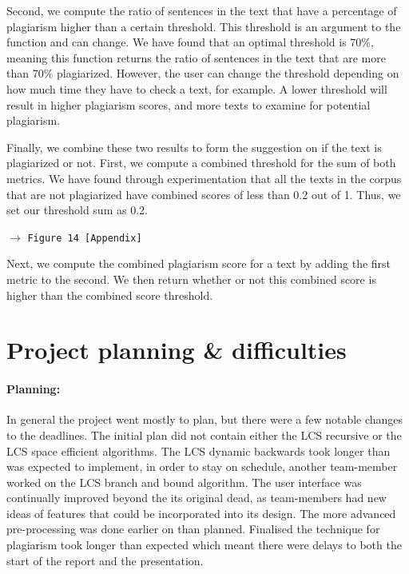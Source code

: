 \documentclass[a4paper,12pt]{article}
\newcommand{\see}[1]{\begin{flushright}$\rightarrow$ \texttt{#1 [Appendix]}\end{flushright}}
\newcommand{\seeFigure}[1]{\see{Figure #1}}
\begin{document}
Second, we compute the ratio of sentences in the text that have a percentage of plagiarism higher than a 
certain threshold. This threshold is an argument to the function and can change. We have found that an optimal 
threshold is 70\%, meaning this function returns the ratio of sentences in the text that are more than 70\% 
plagiarized. However, the user can change the threshold depending on how much time they have to check a text,
for example. A lower threshold will result in higher plagiarism scores, and more texts to examine for potential 
plagiarism. 

Finally, we combine these two results to form the suggestion on if the text is plagiarized or not. First, we compute 
a combined threshold for the sum of both metrics. We have found through experimentation that all the texts in the 
corpus that are not plagiarized have combined scores of less than 0.2 out of 1. Thus, we set our threshold sum as 0.2. 
\seeFigure{14}
Next, we compute the combined plagiarism score for a text by adding the first metric to the second.
We then return whether or not this combined score is higher than the combined score threshold.
	
	\section{Project planning \& difficulties}
		\paragraph{Planning:}
		In general the project went mostly to plan, but there were a few notable changes to the deadlines. The initial plan did not contain either the LCS recursive or the LCS space efficient algorithms. The LCS dynamic backwards took longer than was expected to implement, in order to stay on schedule, another team-member worked on the LCS branch and bound algorithm. The user interface was continually improved beyond the its original dead, as team-members had new ideas of features that could be incorporated into its design. The more advanced pre-processing was done earlier on than planned. Finalised the technique for plagiarism took longer than expected which meant there were delays to both the start of the report and the presentation.
\end{document}
